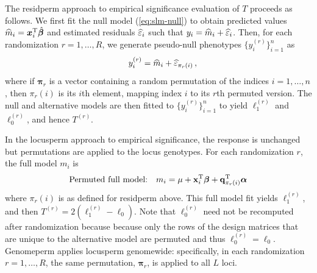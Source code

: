   The residperm approach to empirical significance evaluation of $T$ proceeds as follows.
  We first fit the null model (\autoref{eq:slm-null}) to obtain predicted values $\widehat{m}_i = \bm{x}_i^\mathrm{T}\hat{\boldsymbol{\beta}}$ and estimated residuals $\widehat{\varepsilon}_i$ such that $y_i = \widehat{m}_i + \widehat{\varepsilon}_i$.
  Then, for each randomization $r=1,\dots,R$, we generate pseudo-null phenotypes $\{y^{(r)}_i\}^n_{i=1}$ as
  \[
    \quad y_i^{(r)} = \widehat{m}_i + \widehat{\varepsilon}_{\pi_r(i)}\,,
  \]
  where if $\bm{\pi}_r$ is a vector containing a random permutation of the indices $i=1,\dots,n$, then $\pi_r(i)$ is its $i$th element, mapping index $i$ to its $r$th permuted version.
  The null and alternative models are then fitted to $\{y_i^{(r)}\}^n_{i=1}$ to yield $\ell_1^{(r)}$ and $\ell_0^{(r)}$, and hence $T^{(r)}$.

  In the locusperm approach to empirical significance, the response is unchanged but permutations are applied to the locus genotypes. 
  For each randomization $r$, the full model $m_i$ is
  \begin{equation}\label{eq:slm_perm_alt}
    \text{Permuted full model:}\quad m_i = \mu + \mathbf{x}_i^\mathrm{T}\bm{\beta} + \mathbf{q}_{\pi_r(i)}^\mathrm{T}\bm{\alpha}
  \end{equation}
  where $\pi_r(i)$ is as defined for residperm above.
  This full model fit yields $\ell_1^{(r)}$, and then $T^{(r)} = 2(\ell_1^{(r)} - \ell_0)$.
  Note that $\ell_0^{(r)}$ need not be recomputed after randomization because because only the rows of the design matrices that are unique to the alternative model are permuted and thus $\ell_0^{(r)} = \ell_0$.
  Genomeperm applies locusperm genomewide: specifically, in each randomization $r=1,\dots,R$, the same permutation, $\bm{\pi}_r$, is applied to all $L$ loci.



